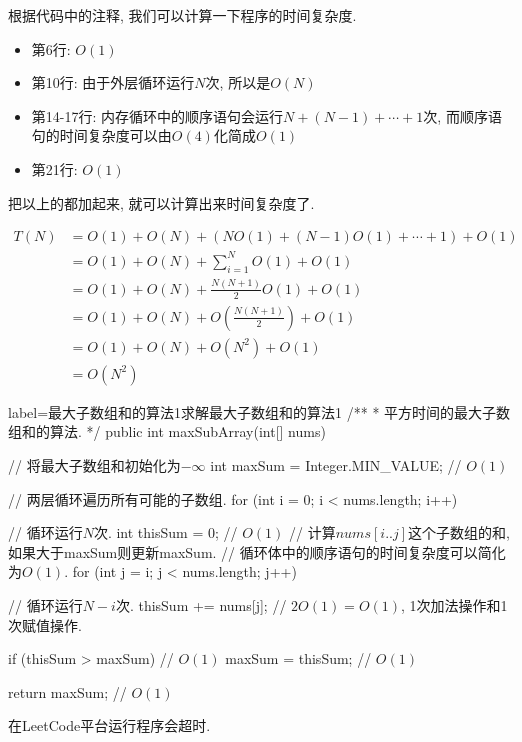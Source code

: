 \documentclass[oneside]{ctexbook}
\begin{document}
{根据代码中的注释, 我们可以计算一下程序的时间复杂度.

\begin{itemize}
    \item 第6行: $O(1)$
    \item 第10行: 由于外层循环运行$N$次, 所以是$O(N)$
    \item 第14-17行: 内存循环中的顺序语句会运行$N + (N-1) + \cdots + 1$次, 而顺序语句的时间复杂度可以由$O(4)$化简成$O(1)$
    \item 第21行: $O(1)$
\end{itemize}

把以上的都加起来, 就可以计算出来时间复杂度了.

\begin{equation*}
    \begin{split}
        T(N) &= O(1) + O(N) + (NO(1) + (N-1)O(1) + \cdots + 1) + O(1) \\
             &= O(1) + O(N) + \sum_{i=1}^{N}O(1) + O(1) \\
             &= O(1) + O(N) + \frac{N(N+1)}{2}O(1) + O(1) \\
             &= O(1) + O(N) + O(\frac{N(N+1)}{2}) + O(1) \\
             &= O(1) + O(N) + O(N^2) + O(1) \\
             &= O(N^2)
    \end{split}
\end{equation*}

\begin{myjava}{label={最大子数组和的算法1}}{求解最大子数组和的算法1}
/**
  * 平方时间的最大子数组和的算法.
  */
public int maxSubArray(int[] nums) {
    // 将最大子数组和初始化为$-\infty$
    int maxSum = Integer.MIN_VALUE; // $O(1)$

    // 两层循环遍历所有可能的子数组.
    for (int i = 0; i < nums.length; i++) { // 循环运行$N$次.
        int thisSum = 0; // $O(1)$
        // 计算$nums[i..j]$这个子数组的和, 如果大于maxSum则更新maxSum.
        // 循环体中的顺序语句的时间复杂度可以简化为$O(1)$.
        for (int j = i; j < nums.length; j++) { // 循环运行$N-i$次.
            thisSum += nums[j]; // $2O(1)=O(1)$, 1次加法操作和1次赋值操作.

            if (thisSum > maxSum) // $O(1)$
                maxSum = thisSum; // $O(1)$
        }
    }

    return maxSum; // $O(1)$
}
\end{myjava}

\begin{marker}
在LeetCode平台运行程序会超时.
\end{marker}

}
\end{document}
